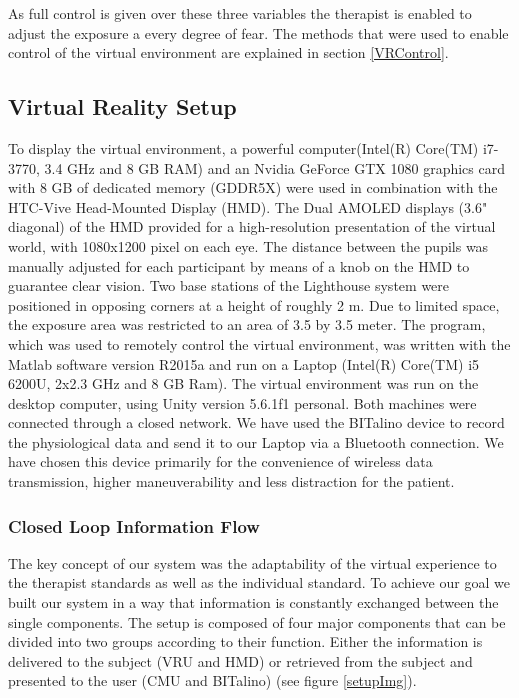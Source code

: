 As full control is given over these three variables the therapist is enabled to adjust the exposure a every degree of fear. 
The methods that were used to enable control of the virtual environment are explained in section \ref{VRControl}.

\subsection{Virtual Reality Setup}
To display the virtual environment, a powerful computer(Intel(R) Core(TM) i7-3770, 3.4 GHz and 8 GB RAM) and an Nvidia GeForce GTX 1080 graphics card with 8 GB of dedicated memory (GDDR5X) were used in combination with the HTC-Vive Head-Mounted Display (HMD). The Dual AMOLED displays (3.6" diagonal) of the HMD provided for a high-resolution presentation of the virtual world, with 1080x1200 pixel on each eye. The distance between the pupils was manually adjusted for each participant by means of a knob on the HMD to guarantee clear vision. 
Two base stations of the Lighthouse system were positioned in opposing corners at a height of roughly 2 m. Due to limited space, the exposure area was restricted to an area of 3.5 by 3.5 meter. The program, which was used to remotely control the virtual environment, was written with the Matlab software version R2015a and run on a Laptop (Intel(R) Core(TM) i5 6200U, 2x2.3 GHz and 8 GB Ram). The virtual environment was run on the desktop computer, using Unity version 5.6.1f1 personal. Both machines were connected through a closed network. We have used the BITalino device to record the physiological data and send it to our Laptop via a Bluetooth connection. We have chosen this device primarily for the convenience of wireless data transmission, higher maneuverability and less distraction for the patient. 

\subsubsection{Closed Loop Information Flow}
The key concept of our system was the adaptability of the virtual experience to the therapist standards as well as the individual standard. To achieve our goal we built our system in a way that information is constantly exchanged between the single components.
The setup is composed of four major components that can be divided into two groups according to their function. Either the information is delivered to the subject (VRU and HMD) or retrieved from the subject and presented to the user (CMU and BITalino) (see figure \ref{setupImg}).\\ 

